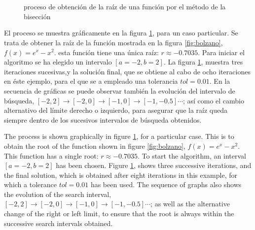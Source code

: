 \begin{paracol}{2}
 \switchcolumn
\end{paracol} 

\begin{figure}
\centering
{} \qquad
{}\\
\qquad
{}\\

\caption{proceso de obtención de la raíz de una función por el método de la bisección }
\label{fig:bisec}
\end{figure}

\begin{paracol}{2}
El proceso se muestra gráficamente en la figura \ref{fig:bisec}, para un caso particular. Se trata de obtener la raíz de la función mostrada en la figura \ref{fig:bolzano}, $f(x)=e^x-x^2$. esta función tiene una única raíz: $r\approx -0.7035$. Para iniciar el algoritmo se ha elegido un intervalo $[a=-2,b=2]$. La figura \ref{fig:bisec}, muestra tres iteraciones sucesivas,y la solución final, que se obtiene al cabo de ocho iteraciones en éste ejemplo, para el que se a empleado una tolerancia $tol=0.01$. En la secuencia de gráficas se puede observar también la evolución del intervalo de búsqueda, $[-2, 2]\rightarrow [-2, 0] \rightarrow [-1, 0] \rightarrow [-1, -0.5] \cdots$; así como el cambio alternativo del límite derecho o izquierdo, para asegurar que la raíz queda siempre dentro de los sucesivos intervalos de búsqueda obtenidos. 

\switchcolumn

The process is shown graphically in figure \ref{fig:bisec}, for a particular case. This is to obtain the root of the function shown in figure \ref{fig:bolzano}, $f(x)=e^x-x^2$. This function has a single root: $r\approx -0.7035$. To start the algorithm, an interval $[a=-2,b=2]$ has been chosen. Figure \ref{fig:bisec}, shows three successive iterations, and the final solution, which is obtained after eight iterations in this example, for which a tolerance $tol=0.01$ has been used. The sequence of graphs also shows the evolution of the search interval, $[-2, 2]\rightarrow [-2, 0] \rightarrow [-1, 0] \rightarrow [-1, -0.5] \cdots$; as well as the alternative change of the right or left limit, to ensure that the root is always within the successive search intervals obtained. 







\end{paracol}
